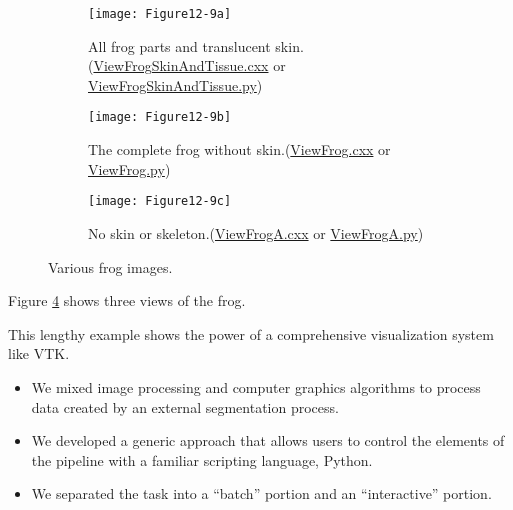\begin{figure}[htb]
    \begin{subfigure}[h]{0.48\linewidth}
        \texttt{[image: Figure12-9a]}
        \caption{All frog parts and translucent skin.(\href{https://lorensen.github.io/VTKExamples/site/Cxx/Visualization/ViewFrogSkinAndTissue}{ViewFrogSkinAndTissue.cxx} or \href{https://lorensen.github.io/VTKExamples/site/Python/Visualization/ViewFrogSkinAndTissue/}{ViewFrogSkinAndTissue.py})}\label{fig:Figure12-9a}
    \end{subfigure}
    \hfill
    \begin{subfigure}[h]{0.48\linewidth}
        \texttt{[image: Figure12-9b]}
        \caption{The complete frog without skin.(\href{https://lorensen.github.io/VTKExamples/site/Cxx/Visualization/ViewFrog}{ViewFrog.cxx} or \href{https://lorensen.github.io/VTKExamples/site/Python/Visualization/ViewFrog/}{ViewFrog.py})}\label{fig:Figure12-9b}
    \end{subfigure}%
    \hfill
    \begin{subfigure}[h]{0.48\linewidth}
        \texttt{[image: Figure12-9c]}
        \caption{No skin or skeleton.(\href{https://lorensen.github.io/VTKExamples/site/Cxx/Visualization/ViewFrogA}{ViewFrogA.cxx} or \href{https://lorensen.github.io/VTKExamples/site/Python/Visualization/ViewFrogA/}{ViewFrogA.py})}\label{fig:Figure12-9c}
    \end{subfigure}
    \caption{Various frog images.}\label{fig:Figure12-9}
\end{figure}

\noindent Figure \ref{fig:Figure12-9} shows three views of the frog.

This lengthy example shows the power of a comprehensive visualization system like VTK.

\begin{itemize}

    \item We mixed image processing and computer graphics algorithms to process data created by an external segmentation process.

    \item We developed a generic approach that allows users to control the elements of the pipeline with a familiar scripting language, Python.

    \item We separated the task into a ``batch'' portion and an ``interactive'' portion.

\end{itemize}


